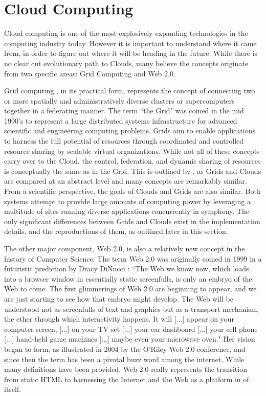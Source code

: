 \section{Cloud Computing}
\label{sec:cloudcomputing}

Cloud computing is one of the most explosively expanding technologies in the computing industry today. However it is important to understand where it came from, in order to figure out where it will be heading in the future.  While there is no clear cut evolutionary path to Clouds, many believe the concepts originate from two specific areas: Grid Computing and Web 2.0.

Grid computing \cite{foster2001a, foster2002b}, in its practical form, represents the concept of connecting two or more spatially and administratively diverse clusters or supercomputers together in a federating manner.  The term ``the Grid" was coined in the mid 1990's to represent a large distributed systems infrastructure for advanced scientific and engineering computing problems. Grids aim to enable applications to harness the full potential of resources through coordinated and controlled resource sharing by scalable virtual organizations.  While not all of these concepts carry over to the Cloud, the control, federation, and dynamic sharing of resources is conceptually the same as in the Grid.  This is outlined by \cite{foster2008cca}, as Grids and Clouds are compared at an abstract level and many concepts are remarkably similar.  From a scientific perspective, the goals of Clouds and Grids are also similar.  Both systems attempt to provide large amounts of computing power by leveraging a multitude of sites running diverse applications concurrently in symphony.  The only significant differences between Grids and Clouds exist in the implementation details, and the reproductions of them, as outlined later in this section.

The other major component, Web 2.0, is also a relatively new concept in the history of Computer Science.  The term Web 2.0 was originally coined in 1999 in a futuristic prediction by Dracy DiNucci \cite{dinucci1999fragmented}: ``The Web we know now, which loads into a browser window in essentially static screenfulls, is only an embryo of the Web to come. The first glimmerings of Web 2.0 are beginning to appear, and we are just starting to see how that embryo might develop. The Web will be understood not as screenfulls of text and graphics but as a transport mechanism, the ether through which interactivity happens. It will [...] appear on your computer screen, [...] on your TV set [...] your car dashboard [...] your cell phone [...] hand-held game machines [...] maybe even your microwave oven."  Her vision began to form, as illustrated in 2004 by the O'Riley Web 2.0 conference, and since then the term has been a pivotal buzz word among the internet.  While many definitions have been provided, Web 2.0 really represents the transition from static HTML to harnessing the Internet and the Web as a platform in of itself.  

